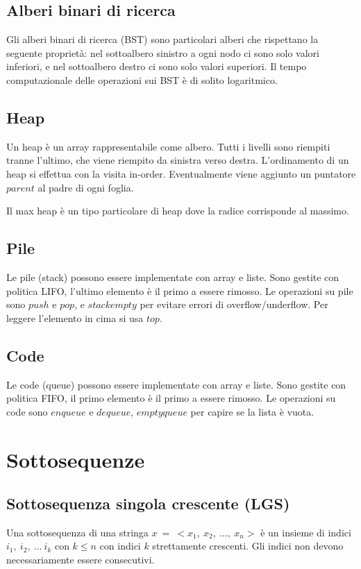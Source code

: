 \subsection{Alberi binari di ricerca}
Gli alberi binari di ricerca (BST) sono particolari alberi che rispettano la seguente proprietà: nel sottoalbero sinistro a ogni nodo ci sono solo valori inferiori, e nel sottoalbero destro ci sono solo valori superiori. Il tempo computazionale delle operazioni sui BST è di solito logaritmico.

\subsection{Heap}
Un heap è un array rappresentabile come albero. Tutti i livelli sono riempiti tranne l'ultimo, che viene riempito da sinistra verso destra. L'ordinamento di un heap si effettua con la visita in-order. Eventualmente viene aggiunto un puntatore $parent$ al padre di ogni foglia. \par
Il max heap è un tipo particolare di heap dove la radice corrisponde al massimo.

\subsection{Pile}
Le pile (stack) possono essere implementate con array e liste. Sono gestite con politica LIFO, l'ultimo elemento è il primo a essere rimosso. Le operazioni su pile sono $push$ e $pop$, e $stackempty$ per evitare errori di overflow/underflow. Per leggere l'elemento in cima si usa $top$.

\subsection{Code}
Le code (queue) possono essere implementate con array e liste. Sono gestite con politica FIFO, il primo elemento è il primo a essere rimosso. Le operazioni su code sono $enqueue$ e $dequeue$, $emptyqueue$ per capire se la lista è vuota.

\newpage
\section{Sottosequenze}

\subsection{Sottosequenza singola crescente (LGS)}
Una sottosequenza di una stringa $x\:=\:<x_1,\:x_2,\:\dots,\:x_n>$ è un insieme di indici $i_1,\:i_2,\:\dots\:i_k$ con $k \leq n$ con indici $k$ strettamente crescenti. Gli indici non devono necessariamente essere consecutivi.

